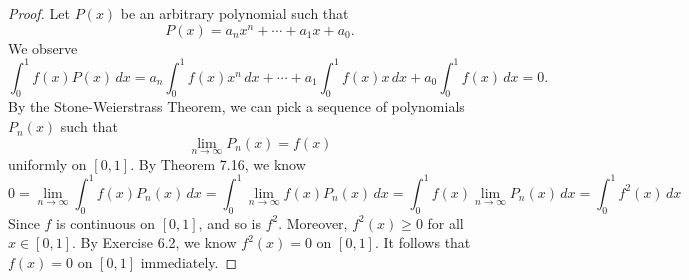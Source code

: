 \begin{Exercise}
	\begin{proof}
		Let $P(x)$ be an arbitrary polynomial such that
		$$
		P(x) = a_n x^n + \cdots + a_1 x + a_0.
		$$
		We observe
		$$
		\int_{0}^{1} f(x) P(x)\,dx
		= a_n \int_{0}^{1} f(x)x^n\,dx + \cdots + a_1 \int_{0}^{1} f(x)x\,dx + a_0 \int_{0}^{1} f(x)\,dx
		= 0.
		$$
		By the Stone-Weierstrass Theorem, we can pick a sequence of polynomials $P_n(x)$ such that
		$$
		\lim_{n\to\infty} P_n(x) = f(x)
		$$
		uniformly on $[0,1]$.
		By Theorem 7.16, we know
		$$
		0
		= \lim_{n\to\infty}\int_{0}^{1}f(x) P_n(x)\,dx
		= \int_{0}^{1} \lim_{n\to\infty} f(x) P_n(x)\,dx
		= \int_{0}^{1} f(x) \lim_{n\to\infty} P_n(x)\,dx
		= \int_{0}^{1} f^2(x)\,dx
		$$
		Since $f$ is continuous on $[0,1]$, and so is $f^2$.
		Moreover, $f^2(x) \geq 0$ for all $x\in[0,1]$.
		By Exercise 6.2, we know $f^2(x) = 0$ on $[0,1]$.
		It follows that $f(x) = 0$ on $[0,1]$ immediately.
	\end{proof}
\end{Exercise}